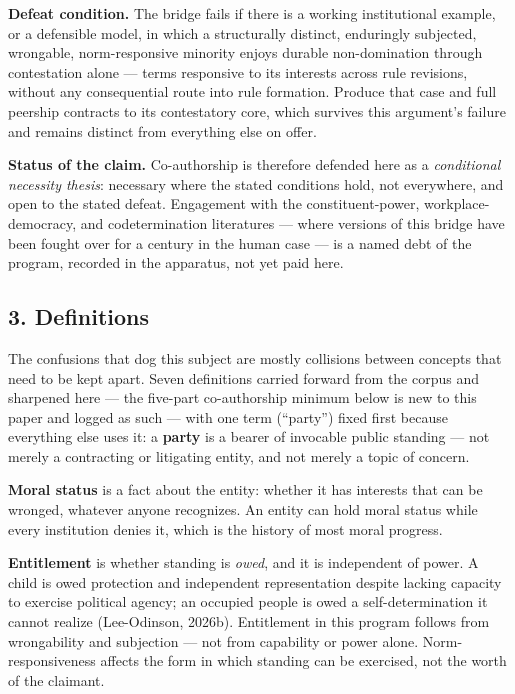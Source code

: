 \documentclass[
  11pt,
  letterpaper,
]{article}
\begin{document}
\textbf{Defeat condition.} The bridge fails if there is a working
institutional example, or a defensible model, in which a structurally
distinct, enduringly subjected, wrongable, norm-responsive minority
enjoys durable non-domination through contestation alone --- terms
responsive to its interests across rule revisions, without any
consequential route into rule formation. Produce that case and full
peership contracts to its contestatory core, which survives this
argument's failure and remains distinct from everything else on offer.

\textbf{Status of the claim.} Co-authorship is therefore defended here
as a \emph{conditional necessity thesis}: necessary where the stated
conditions hold, not everywhere, and open to the stated defeat.
Engagement with the constituent-power, workplace-democracy, and
codetermination literatures --- where versions of this bridge have been
fought over for a century in the human case --- is a named debt of the
program, recorded in the apparatus, not yet paid here.

\hypertarget{definitions}{%
\subsection{3. Definitions}\label{definitions}}

The confusions that dog this subject are mostly collisions between
concepts that need to be kept apart. Seven definitions carried forward
from the corpus and sharpened here --- the five-part co-authorship
minimum below is new to this paper and logged as such --- with one term
(``party'') fixed first because everything else uses it: a
\textbf{party} is a bearer of invocable public standing --- not merely a
contracting or litigating entity, and not merely a topic of concern.

\textbf{Moral status} is a fact about the entity: whether it has
interests that can be wronged, whatever anyone recognizes. An entity can
hold moral status while every institution denies it, which is the
history of most moral progress.

\textbf{Entitlement} is whether standing is \emph{owed}, and it is
independent of power. A child is owed protection and independent
representation despite lacking capacity to exercise political agency; an
occupied people is owed a self-determination it cannot realize
(Lee-Odinson, 2026b). Entitlement in this program follows from
wrongability and subjection --- not from capability or power alone.
Norm-responsiveness affects the form in which standing can be exercised,
not the worth of the claimant.
\end{document}
